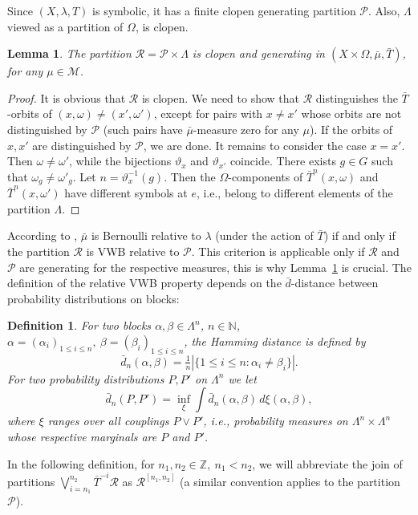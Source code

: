 \documentclass{amsart}
\newtheorem{lem}[thm]{Lemma}
\newtheorem{defn}[thm]{Definition}
\theoremstyle{remark}
\def \N {\mathbb N}
\def \Z {\mathbb Z}
\def \R {\mathcal R}
\def \M {\mathcal M}
\def \P {\mathcal P}
\begin{document}
Since $(X,\lambda,T)$ is symbolic, it has a finite clopen generating partition $\P$. Also, $\Lambda$ viewed as a partition of $\Omega$, is clopen. 

\begin{lem}\label{gener}
The partition $\R=\P\times\Lambda$ is clopen and generating in $(X\times\Omega,\bar\mu,\bar T)$, for any $\mu\in\M$. 
\end{lem}
\begin{proof}It is obvious that $\R$ is clopen.
We need to show that $\R$ distinguishes the $\bar T$-orbits of $(x,\omega)\neq(x',\omega')$, except for pairs with $x\neq x'$ whose orbits are not distinguished by $\P$ (such pairs have $\bar\mu$-measure zero for any $\mu$). If the orbits of $x, x'$ are distinguished by $\P$, we are done. It remains to consider the case $x=x'$.
Then $\omega\neq\omega'$, while the bijections $\vartheta_x$ and $\vartheta_{x'}$ coincide. There exists $g\in G$ such that $\omega_g\neq\omega'_g$. Let $n=\vartheta_x^{-1}(g)$. Then the $\Omega$-components of $\bar T^n(x,\omega)$ and $\bar T^n(x,\omega')$ have different symbols at $e$, i.e., belong to different elements of the partition $\Lambda$.
\end{proof}

According to \cite{11a}, $\bar\mu$ is Bernoulli relative to $\lambda$ (under the action of $\bar T$) if and only if the partition $\R$ is VWB relative to $\P$. This criterion is applicable only if $\R$ and $\P$ are generating for the respective measures, this is why Lemma~\ref{gener} is crucial. The definition of the relative VWB property depends on the $\bar d$-distance between probability distributions on blocks: 

\begin{defn}\label{dbar}
For two blocks $\alpha,\beta\in\Lambda^n$,  $n\in\N$,
$\alpha=(\alpha_i)_{1\le i\le n},\ \beta=(\beta_i)_{1\le i\le n}$, the \emph{Hamming distance} is defined by
$$
\bar d_n(\alpha,\beta)=\tfrac1n|\{1\le i\le n:\alpha_i\neq\beta_i\}|.
$$
For two probability distributions $P,P'$ on $\Lambda^n$ we let
$$
\bar d_n(P,P') = \inf_\xi\int\bar d_n(\alpha,\beta)\, d\xi(\alpha,\beta),
$$
where $\xi$ ranges over all couplings $P\vee P'$, i.e., probability measures on $\Lambda^n\times\Lambda^n$ whose respective marginals are $P$ and $P'$.
\end{defn}


In the following definition, for $n_1,n_2\in\Z,\ n_1<n_2$, we will abbreviate the join of partitions $\bigvee_{i=n_1}^{n_2}\bar T^{-i}\R$ as $\R^{[n_1,n_2]}$ (a similar convention applies to the partition~$\P$).
\end{document}
